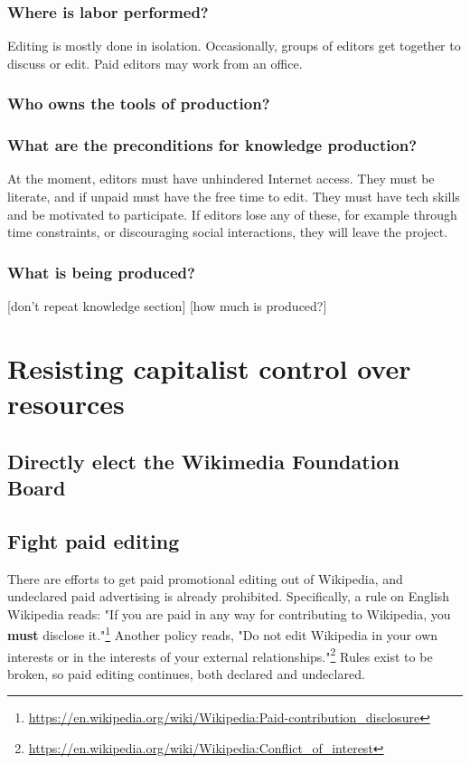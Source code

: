 \documentclass[format=sigconf, authorversion]{acmart}
\begin{document}
\subsubsection{Where is labor performed?}

Editing is mostly done in isolation.  Occasionally, groups of editors get together to discuss or edit.  Paid editors may work from an office.

\subsubsection{Who owns the tools of production?}



\subsubsection{What are the preconditions for knowledge production?}

At the moment, editors must have unhindered Internet access.  They must be literate, and if unpaid must have the free time to edit.  They must have tech skills and be motivated to participate.  If editors lose any of these, for example through time constraints, or discouraging social interactions, they will leave the project.

\subsubsection{What is being produced?}

[don't repeat knowledge section]
[how much is produced?]

\section{Resisting capitalist control over resources}

\subsection{Directly elect the Wikimedia Foundation Board}

\subsection{Fight paid editing}

There are efforts to get paid promotional editing out of Wikipedia, and undeclared paid advertising is already prohibited.  Specifically, a rule on English Wikipedia reads: "If you are paid in any way for contributing to Wikipedia, you \textbf{must} disclose it."\footnote{\url{https://en.wikipedia.org/wiki/Wikipedia:Paid-contribution_disclosure}} Another policy reads, "Do not edit Wikipedia in your own interests or in the interests of your external relationships."\footnote{\url{https://en.wikipedia.org/wiki/Wikipedia:Conflict_of_interest}} Rules exist to be broken, so paid editing continues, both declared and undeclared.
\end{document}
